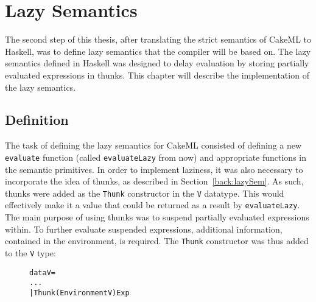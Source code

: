\chapter{Lazy Semantics}
\label{lazySem}
The second step of this thesis, after translating the strict semantics of CakeML
to Haskell, was to define lazy semantics that the compiler will be based on.
The lazy semantics defined in Haskell was designed to delay evaluation by
storing partially evaluated expressions in thunks. This chapter will describe
the implementation of the lazy semantics.

\section{Definition}
\label{lazySem:impl}

The task of defining the lazy semantics for CakeML consisted of defining a new
\texttt{evaluate} function (called \texttt{evaluateLazy} from now) and
appropriate functions in the semantic primitives.
In order to implement laziness, it was also necessary to incorporate the idea of
thunks, as described in Section~\ref{back:lazySem}. As such, thunks were added
as the \texttt{Thunk} constructor in the \texttt{V} datatype. This would
effectively make it a value that could be returned as a result by
\texttt{evaluateLazy}. The main purpose of using thunks was to suspend partially
evaluated expressions within. To further evaluate suspended expressions,
additional information, contained in the environment, is required.
The \texttt{Thunk} constructor was thus added to the \texttt{V} type:

\begin{figure}[H]
\begin{alltt}
  data V =
    ...
    | Thunk (Environment V) Exp
\end{alltt}
\end{figure}

